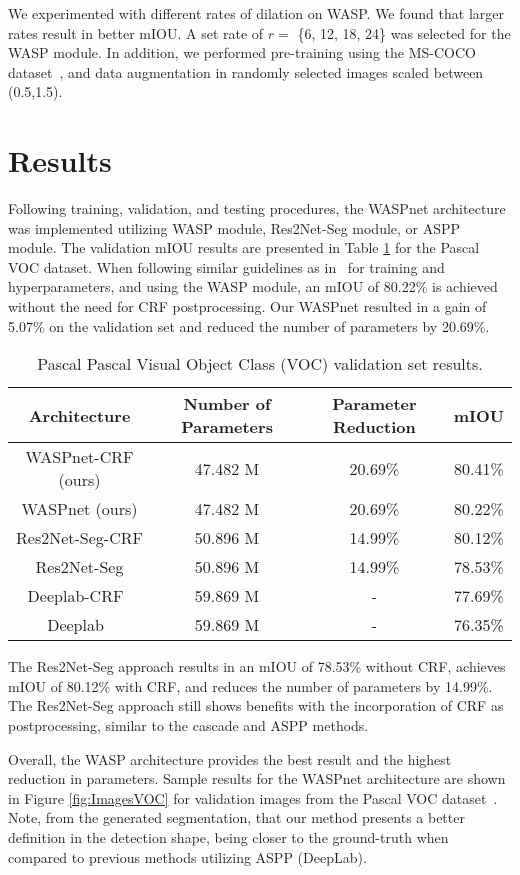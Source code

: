 \documentclass[sensors,article,accept,moreauthors,pdftex]{Definitions/mdpi}
\begin{document}
We experimented with different rates of dilation on WASP. We found that larger rates result in better mIOU. A set rate of $r =$ \{6, 12, 18, 24\} was selected for the WASP module. In addition, we performed pre-training using the MS-COCO dataset~\cite{COCO}, and data augmentation in randomly selected images scaled between (0.5,1.5).

\section{Results}

Following training, validation, and testing procedures, the WASPnet architecture was implemented utilizing WASP module, Res2Net-Seg module, or ASPP module.
The validation mIOU results are presented in Table \ref{tab:TrainingVOC} for the Pascal VOC dataset.
When following similar guidelines as in~\cite{DeepLab} for training and hyperparameters, and using the WASP module, an mIOU of 80.22\% is achieved without the need for CRF postprocessing. Our WASPnet resulted in a gain of 5.07\% on the validation set and reduced the number of parameters by 20.69\%.


\begin{table}[H]
\caption{Pascal Pascal Visual Object Class (VOC) validation set results.}
\centering
\begin{tabular}{cccc}
\toprule
\textbf{Architecture}& \textbf{Number of Parameters} & \textbf{Parameter Reduction} & \textbf{mIOU}\\
\midrule
WASPnet-CRF (ours)&47.482 M&20.69\% &80.41\%\\WASPnet (ours)&47.482 M&20.69\%&80.22\%\\
Res2Net-Seg-CRF&50.896 M&14.99\%&80.12\%\\
Res2Net-Seg&50.896 M&14.99\%&78.53\%\\
Deeplab-CRF~\cite{DeepLab}&59.869 M&-&77.69\%\\
Deeplab~\cite{DeepLab}&59.869 M&-&76.35\%\\
\bottomrule
\end{tabular}
\label{tab:TrainingVOC}
\end{table}

The Res2Net-Seg approach results in an mIOU of 78.53\% without CRF, achieves  mIOU  of 80.12\% with CRF, and reduces the number of parameters by 14.99\%. The Res2Net-Seg approach still shows benefits with the incorporation of CRF as postprocessing, similar to the cascade and ASPP methods.

Overall, the WASP architecture provides the best result and the highest reduction in parameters.
Sample results for the WASPnet architecture are shown in Figure \ref{fig:ImagesVOC} for validation images from the Pascal VOC dataset~\cite{Pascal}. Note, from the generated segmentation, that our method presents a better definition in the detection shape, being closer to the ground-truth when compared to previous methods utilizing ASPP (DeepLab).
\end{document}
